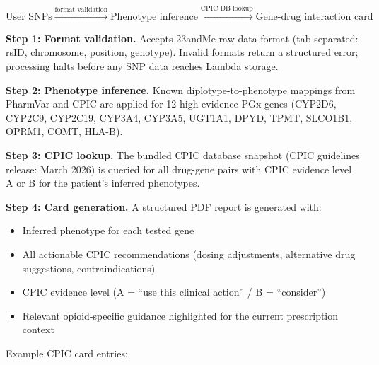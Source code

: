 \documentclass[
  12pt,
]{book}
\providecommand{\tightlist}{%
  \setlength{\itemsep}{0pt}\setlength{\parskip}{0pt}}
\begin{document}
\[\text{User SNPs} \xrightarrow{\text{format validation}}
  \text{Phenotype inference} \xrightarrow{\text{CPIC DB lookup}}
  \text{Gene-drug interaction card}\]

\textbf{Step 1: Format validation.} Accepts 23andMe raw data format
(tab-separated: rsID, chromosome, position, genotype). Invalid formats
return a structured error; processing halts before any SNP data reaches
Lambda storage.

\textbf{Step 2: Phenotype inference.} Known diplotype-to-phenotype
mappings from PharmVar and CPIC are applied for 12 high-evidence PGx
genes (CYP2D6, CYP2C9, CYP2C19, CYP3A4, CYP3A5, UGT1A1, DPYD, TPMT,
SLCO1B1, OPRM1, COMT, HLA-B).

\textbf{Step 3: CPIC lookup.} The bundled CPIC database snapshot (CPIC
guidelines release: March 2026) is queried for all drug-gene pairs with
CPIC evidence level A or B for the patient's inferred phenotypes.

\textbf{Step 4: Card generation.} A structured PDF report is generated
with:

\begin{itemize}
\tightlist
\item
  Inferred phenotype for each tested gene
\item
  All actionable CPIC recommendations (dosing adjustments, alternative
  drug suggestions, contraindications)
\item
  CPIC evidence level (A = ``use this clinical action'' / B =
  ``consider'')
\item
  Relevant opioid-specific guidance highlighted for the current
  prescription context
\end{itemize}

Example CPIC card entries:
\end{document}
